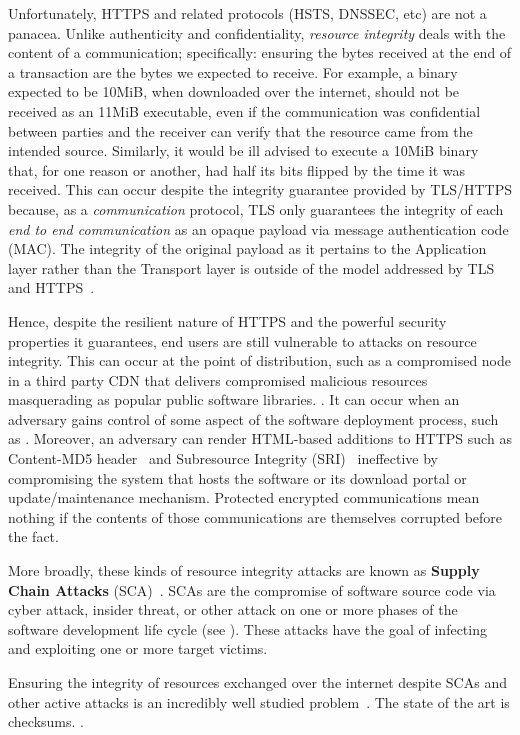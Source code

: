 Unfortunately, HTTPS and related protocols (HSTS, DNSSEC, etc) are not a
panacea. Unlike authenticity and confidentiality, \textit{resource integrity}
deals with the content of a communication; specifically: ensuring the bytes
received at the end of a transaction are the bytes we expected to receive. For
example, a binary expected to be 10MiB, when downloaded over the internet,
should not be received as an 11MiB executable, even if the communication was
confidential between parties and the receiver can verify that the resource came
from the intended source. Similarly, it would be ill advised to execute a 10MiB
binary that, for one reason or another, had half its bits flipped by the time it
was received. This can occur despite the integrity guarantee provided by
TLS/HTTPS because, as a \textit{communication} protocol, TLS only guarantees the
integrity of each \textit{end to end communication} as an opaque payload via
message authentication code (MAC). The integrity of the original payload as it
pertains to the Application layer rather than the Transport layer is outside of
the model addressed by TLS and HTTPS~\cite{TLS1.2, HTTPS}.

Hence, despite the resilient nature of HTTPS and the powerful security
properties it guarantees, end users are still vulnerable to attacks on resource
integrity. This can occur at the point of distribution, such as a compromised
node in a third party CDN that delivers compromised malicious resources
masquerading as popular public software libraries. . It can occur when an adversary gains control of some
aspect of the software deployment process, such as . Moreover, an adversary can render HTML-based additions to HTTPS
such as Content-MD5 header~\cite{MD5Header} and Subresource Integrity
(SRI)~\cite{SRI} ineffective by compromising the system that hosts the software
or its download portal or update/maintenance mechanism. Protected encrypted
communications mean nothing if the contents of those communications are
themselves corrupted before the fact.

More broadly, these kinds of resource integrity attacks are known as
\textbf{Supply Chain Attacks} (SCA)~\cite{}. SCAs are the compromise of software
source code via cyber attack, insider threat, or other attack on one or more
phases of the software development life cycle (see ). These
attacks have the goal of infecting and exploiting one or more target victims.

Ensuring the integrity of resources exchanged over the internet despite SCAs and
other active attacks is an incredibly well studied problem~\cite{MD5Header,
HTTP1.1, HTTPS, SRI, LF, OpenPGP1, DNSSEC}. The state of the art is checksums.
.

